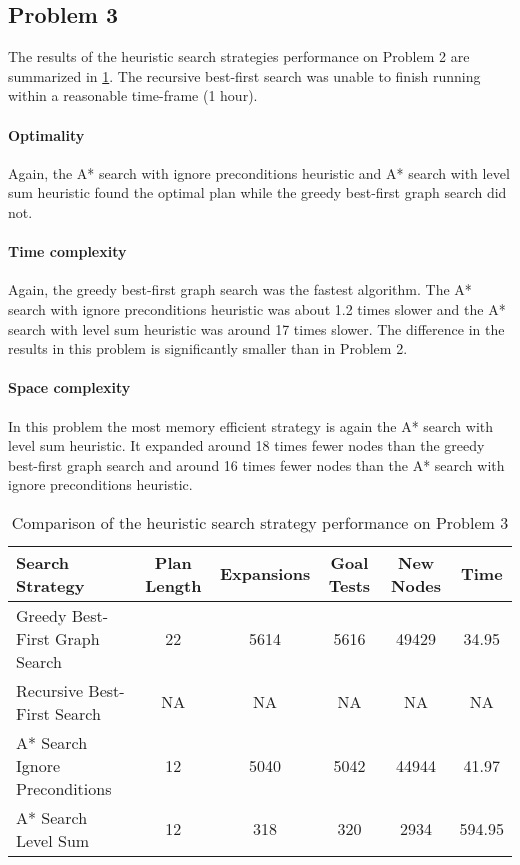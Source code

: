 \documentclass[11pt]{article}
\begin{document}
\subsection{Problem 3}

The results of the heuristic search strategies performance on Problem 2 are summarized in \ref{table:hp3}. The recursive best-first search was unable to finish running within a reasonable time-frame (1 hour).

\paragraph{Optimality}

Again, the A* search with ignore preconditions heuristic and A* search with level sum heuristic found the optimal plan while the greedy best-first graph search did not.

\paragraph{Time complexity}

Again, the greedy best-first graph search was the fastest algorithm. The A* search with ignore preconditions heuristic was about 1.2 times slower and the A* search with level sum heuristic was around 17 times slower. The difference in the results in this problem is significantly smaller than in Problem 2.

\paragraph{Space complexity}

In this problem the most memory efficient strategy is again the A* search with level sum heuristic. It expanded around 18 times fewer nodes than the greedy best-first graph search and around 16 times fewer nodes than the A* search with ignore preconditions heuristic.

\begin{table}[H]
  \centering
  \caption{Comparison of the heuristic search strategy performance on Problem 3}
  \bigskip
  \label{table:hp3}
  \bgroup
  \def\arraystretch{1.5}
  \begin{tabular}{p{3.7cm}|c|c|c|c|c}
    Search Strategy & Plan Length & Expansions & Goal Tests & New Nodes & Time \\
    \hline
    Greedy Best-First Graph Search & 22 & 5614 & 5616 & 49429 & 34.95 \\
    Recursive Best-First Search & NA & NA & NA & NA & NA \\
    A* Search Ignore Preconditions & 12 & 5040 & 5042 & 44944 & 41.97 \\
    A* Search Level Sum & 12 & 318 & 320 & 2934 & 594.95 \\
  \end{tabular}
  \egroup
\end{table}
\end{document}
